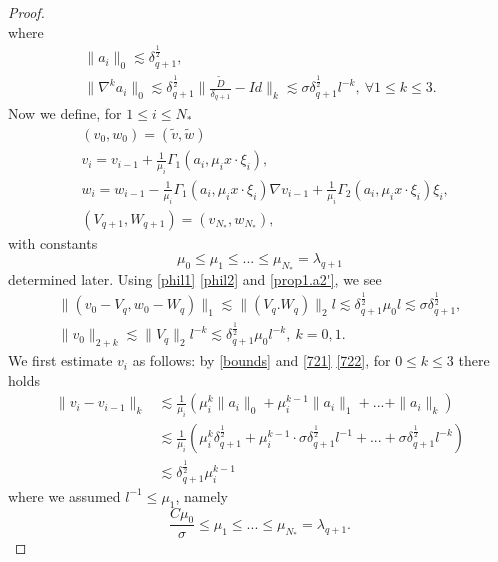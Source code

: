 \documentclass[10pt,a4paper]{amsart}
\begin{document}
\begin{proof}
\begin{equation}
\end{equation}
where
\begin{gather}
    \|a_i\|_0\lesssim\delta_{q+1}^\frac{1}{2}, \label{721}\\
    \|\nabla^k a_i\|_0\lesssim\delta_{q+1}^\frac{1}{2}\|\frac{\tilde D}{\delta_{q+1}}-Id\|_k\lesssim \sigma\delta_{q+1}^\frac{1}{2}l^{-k},\ \forall 1\le k\le 3. \label{722}
\end{gather}
Now we define, for $1\le i\le N_*$
\begin{align}
    &(v_0, w_0)=(\tilde v, \tilde w)\\
    & v_i= v_{i-1}+\frac{1}{\mu_i}\Gamma_1(a_i, \mu_i x\cdot \xi_i),\\
    & w_i= w_{i-1}-\frac{1}{\mu_i}\Gamma_1(a_i,\mu_i x\cdot \xi_i)\nabla v_{i-1}+\frac{1}{\mu_i}\Gamma_2(a_i,\mu_i x\cdot \xi_i) \xi_i,\\
    & (V_{q+1},W_{q+1})=(v_{N_*},w_{N_*}),
\end{align}
with constants \begin{equation*}
\mu_0\le\mu_1\le...\le\mu_{N_*}=\lambda_{q+1}
\end{equation*}
determined later. Using \eqref{phil1} \eqref{phil2} and \eqref{prop1.a2'}, we see
\begin{gather}
    \|(v_0-V_q,w_0-W_q)\|_1\lesssim \|(V_q.W_q)\|_2 l\lesssim \delta_{q+1}^\frac{1}{2}\mu_0 l\lesssim \sigma\delta_{q+1}^\frac{1}{2},\label{401}\\
    \|v_0\|_{2+k}\lesssim \|V_q\|_2 l^{-k}\lesssim \delta_{q+1}^\frac{1}{2}\mu_0 l^{-k},\ k=0,1. \label{402}
\end{gather}
We first estimate $v_i$ as follows: by  \eqref{bounds} and \eqref{721} \eqref{722}, for $0\le k\le 3$ there holds
\begin{equation}\label{403}
\begin{aligned}
    \|v_i- v_{i-1}\|_k
    &\lesssim \frac{1}{\mu_i}(\mu_i^k\|a_i\|_0+\mu_i^{k-1}\|a_i\|_1+...+\|a_i\|_k)\\
    &\lesssim\frac{1}{\mu_i}(\mu_i^k\delta_{q+1}^\frac{1}{2}+\mu_i^{k-1}\cdot\sigma\delta_{q+1}^\frac{1}{2}l^{-1}+...+\sigma\delta_{q+1}^\frac{1}{2}l^{-k})\\
    &\lesssim \delta_{q+1}^\frac{1}{2}\mu_i^{k-1}
\end{aligned}
\end{equation}
where we assumed $l^{-1}\le\mu_1$, namely
\begin{equation}\label{ineq03}
    \frac{C\mu_0}{\sigma}\le\mu_1\le...\le\mu_{N_*}=\lambda_{q+1}.
\end{equation}

\end{proof}
\end{document}
